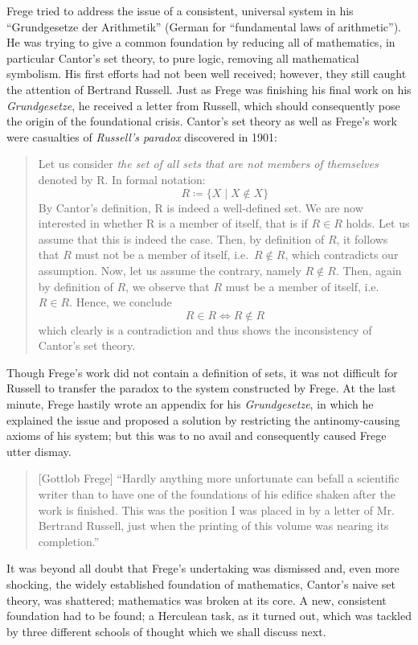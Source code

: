 \documentclass[hidelinks]{article}
\begin{document}
Frege tried to address the issue of a consistent, universal system in his ``Grundgesetze der Arithmetik'' (German for ``fundamental laws of arithmetic''). He was trying to give a common foundation by reducing all of mathematics, in particular Cantor's set theory, to pure logic, removing all mathematical symbolism. His first efforts had not been well received; however, they still caught the attention of Bertrand Russell. Just as Frege was finishing his final work on his \textit{Grundgesetze}, he received a letter from Russell, which should consequently pose the origin of the foundational crisis. Cantor's set theory as well as Frege's work were casualties of \textit{Russell's paradox} discovered in 1901:
\begin{quote}
Let us consider \textit{the set of all sets that are not members of themselves} denoted by R. In formal notation:
\begin{equation*}
	R\coloneqq\{X\mid X\notin X\}
\end{equation*}
By Cantor's definition, R is indeed a well-defined set.
We are now interested in whether R is a member of itself, that is if $R\in R$ holds.
Let us assume that this is indeed the case. Then, by definition of $R$, it follows that $R$ must not be a member of itself, i.e.\ $R\notin R$, which contradicts our assumption. Now, let us assume the contrary, namely $R\notin R$. Then, again by definition of $R$, we observe that $R$ must be a member of itself, i.e.\ $R\in R$. Hence, we conclude
\begin{equation*}
		R\in R\iff R\notin R
\end{equation*}
which clearly is a contradiction and thus shows the inconsistency of Cantor's set theory.
\end{quote}
Though Frege's work did not contain a definition of sets, it was not difficult for Russell to transfer the paradox to the system constructed by Frege. At the last minute, Frege hastily wrote an appendix for his \textit{Grundgesetze}, in which he explained the issue and proposed a solution by restricting the antinomy-causing axioms of his system; but this was to no avail and consequently caused Frege utter dismay.
\begin{quote}[Gottlob Frege]
``Hardly anything more unfortunate can befall a scientific writer than to have one of the foundations of his edifice shaken after the work is finished. This was the position I was placed in by a letter of Mr. Bertrand Russell, just when the printing of this volume was nearing its completion.''\cite{frege_appendix}
\end{quote}
It was beyond all doubt that Frege's undertaking was dismissed and, even more shocking, the widely established foundation of mathematics, Cantor's naive set theory, was shattered; mathematics was broken at its core. A new, consistent foundation had to be found; a Herculean task, as it turned out, which was tackled by three different schools of thought which we shall discuss next.
\end{document}
